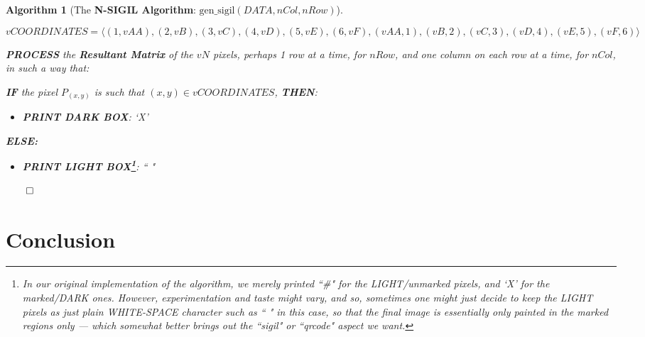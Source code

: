 \documentclass[a4paper, 18pt]{book} %
\newtheorem{alg}{Algorithm}
\begin{document}
\begin{alg}[The \textbf{N-SIGIL Algorithm}: $\text{gen\_sigil}(DATA, nCol, nRow)$]
\begin{enumerate}
{\begin{equation}
vCOORDINATES = \langle (1,vAA), (2,vB), (3,vC), (4,vD), (5,vE), (6,vF), (vAA,1), (vB,2), (vC,3), (vD,4), (vE,5), (vF,6) \rangle
\end{equation}

}

\item { \textbf{PROCESS} the \textbf{Resultant Matrix} of the $vN$ pixels, perhaps 1 row at a time, for $nRow$, and one column on each row at a time, for $nCol$, in such a way that:
\begin{itemize}
\item{ \textbf{IF} the pixel $P_{(x,y)}$ is such that $(x,y) \in vCOORDINATES$, \textbf{THEN}:
\begin{itemize}
\item \textbf{PRINT DARK BOX}: `X' 
\end{itemize}
\item{\textbf{ELSE:}
\begin{itemize}
\item \textbf{PRINT LIGHT BOX\footnote{In our original implementation of the algorithm, we merely printed ``\#" for the LIGHT/unmarked pixels, and `X' for the marked/DARK ones. However, experimentation and taste might vary, and so, sometimes one might just decide to keep the LIGHT pixels as just plain WHITE-SPACE character such as `` " in this case, so that the final image is essentially only painted in the marked regions only --- which somewhat better brings out the ``sigil" or ``qrcode" aspect we want.}}: `` " 
\end{itemize}
}
}
\end{itemize}

}
\end{enumerate}
$\qed$
\end{alg}
  
  
  
  


\chapter{Conclusion}
\label{SECCONC}

\end{document}
